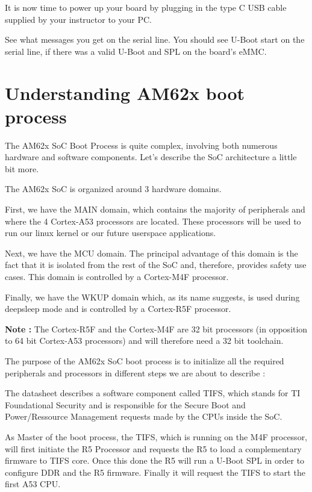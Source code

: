 It is now time to power up your board by plugging in the type C USB
cable supplied by your instructor to your PC.

See what messages you get on the serial line. You should see U-Boot
start on the serial line, if there was a valid U-Boot and SPL on the
board's eMMC.

\section{Understanding AM62x boot process}

The AM62x SoC Boot Process is quite complex, involving both numerous
hardware and software components.
Let's describe the SoC architecture a little bit more.

The AM62x SoC is organized around 3 hardware domains.

First, we have the MAIN domain, which contains the majority of peripherals and
where the 4 Cortex-A53 processors are located. These processors will be used to
run our linux kernel or our future userspace applications.

Next, we have the MCU domain. The principal advantage of this domain is the
fact that it is isolated from the rest of the SoC and, therefore, provides
safety use cases. This domain is controlled by a Cortex-M4F processor.

Finally, we have the WKUP domain which, as its name suggests, is used during
deepsleep mode and is controlled by a Cortex-R5F processor.

\textbf{Note :} The Cortex-R5F and the Cortex-M4F are 32 bit processors
(in opposition to 64 bit Cortex-A53 processors) and will therefore need
a 32 bit toolchain.

The purpose of the AM62x SoC boot process is to initialize all the required
peripherals and processors in different steps we are about to describe :

The datasheet describes a software component called TIFS, which stands for
TI Foundational Security and is responsible for the Secure
Boot and Power/Ressource Management requests made by the CPUs inside the SoC.

As Master of the boot process, the TIFS, which is running on the M4F processor,
will first initiate the R5 Processor and requests the R5 to load a
complementary firmware to TIFS core.
Once this done the R5 will run a U-Boot SPL in order to configure DDR and
the R5 firmware. Finally it will request the TIFS to start the first A53 CPU.

